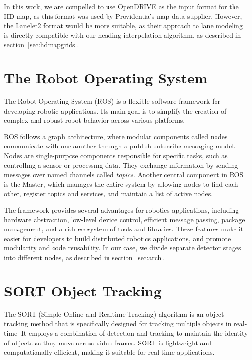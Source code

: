 In this work, we are compelled to use OpenDRIVE as the input format for the HD map, as this format was used by Providentia's map data supplier.
However, the Lanelet2 format would be more suitable, as their approach to lane modeling is directly compatible with our heading interpolation algorithm, as described in section~\ref{sec:hdmapgrids}.


\section{The Robot Operating System}
\label{sec:ros}

The Robot Operating System (ROS) is a flexible software framework for developing robotic applications.
Its main goal is to simplify the creation of complex and robust robot behavior across various platforms.

ROS follows a graph architecture, where modular components called nodes communicate with one another through a publish-subscribe messaging model.
Nodes are single-purpose components responsible for specific tasks, such as controlling a sensor or processing data.
They exchange information by sending messages over named channels called \textit{topics}.
Another central component in ROS is the Master, which manages the entire system by allowing nodes to find each other, register topics and services, and maintain a list of active nodes.

The framework provides several advantages for robotics applications, including hardware abstraction, low-level device control, efficient message passing, package management, and a rich ecosystem of tools and libraries.
These features make it easier for developers to build distributed robotics applications, and promote modularity and code reusability.
In our case, we divide separate detector stages into different nodes, as described in section~\ref{sec:arch}.

\section{SORT Object Tracking}
\label{sec:sort}

The SORT (Simple Online and Realtime Tracking) algorithm is an object tracking method that is specifically designed for tracking multiple objects in real-time.
It employs a combination of detection and tracking to maintain the identity of objects as they move across video frames.
SORT is lightweight and computationally efficient, making it suitable for real-time applications.

